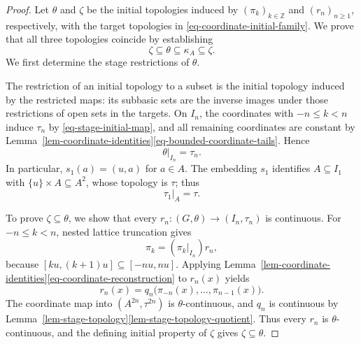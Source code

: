 \documentclass[preprint,3p]{elsarticle}
\theoremstyle{plain}
\theoremstyle{definition}
\numberwithin{equation}{section}
\begin{document}
\begin{proof}
Let $\theta$ and $\zeta$ be the initial topologies induced by
$(\pi_k)_{k\in\mathbb Z}$ and $(r_n)_{n\geq1}$, respectively,
with the target topologies in \eqref{eq-coordinate-initial-family}.
We prove that all three topologies coincide by establishing
\[
 \zeta\subseteq\theta\subseteq\kappa_A\subseteq\zeta.
\]
We first determine the stage restrictions of $\theta$.

The restriction of an initial topology to a subset is the initial
topology induced by the restricted maps: its subbasic sets are the
inverse images under those restrictions of open sets in the targets.
On $I_n$, the coordinates with $-n\leq k<n$ induce $\tau_n$ by
\eqref{eq-stage-initial-map}, and all remaining coordinates are constant
by Lemma~\ref{lem-coordinate-identities}\ref{eq-bounded-coordinate-tails}.  Hence
\begin{equation}
\label{eq-theta-stage-restriction}
 \theta|_{I_n}=\tau_n.
\end{equation}
In particular, $s_1(a)=(u,a)$ for $a\in A$.
The embedding $s_1$ identifies $A\subseteq I_1$ with
$\{u\}\times A\subseteq A^2$, whose topology is $\tau$; thus
\begin{equation}
\label{eq-stage-one-restriction}
 \tau_1|_A=\tau.
\end{equation}

To prove $\zeta\subseteq\theta$, we show that every
$r_n\colon(G,\theta)\longrightarrow(I_n,\tau_n)$ is continuous.
For $-n\leq k<n$, nested lattice truncation gives
\begin{equation}
\label{eq-truncation-coordinate-factorization}
 \pi_k=(\pi_k|_{I_n})r_n,
\end{equation}
because $[ku,(k+1)u]\subseteq[-nu,nu]$.
Applying Lemma~\ref{lem-coordinate-identities}\ref{eq-coordinate-reconstruction}
to $r_n(x)$ yields
\begin{equation}
\label{eq-truncation-coordinates}
 r_n(x)=q_n\bigl(\pi_{-n}(x),\ldots,\pi_{n-1}(x)\bigr).
\end{equation}
The coordinate map into $(A^{2n},\tau^{2n})$ is $\theta$-continuous,
and $q_n$ is continuous by
Lemma~\ref{lem-stage-topology}\ref{lem-stage-topology-quotient}.
Thus every $r_n$ is $\theta$-continuous, and the defining initial
property of $\zeta$ gives $\zeta\subseteq\theta$.


\end{proof}
\end{document}
